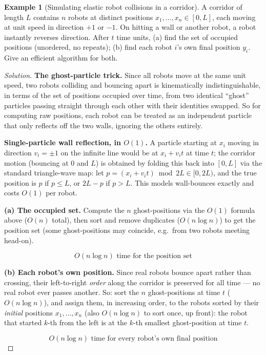 \documentclass[11pt]{article}
\theoremstyle{definition}
\newtheorem{example}{Example}[section]
\begin{document}
\begin{example}[Simulating elastic robot collisions in a corridor]
A corridor of length $L$ contains $n$ robots at distinct positions $x_1,\dots,x_n\in[0,L]$, each moving at unit speed in direction $+1$ or $-1$. On hitting a wall or another robot, a robot instantly reverses direction. After $t$ time units, (a) find the set of occupied positions (unordered, no repeats); (b) find each robot $i$'s own final position $y_i$. Give an efficient algorithm for both.
\end{example}
\begin{proof}[Solution]
\textbf{The ghost-particle trick.} Since all robots move at the same unit speed, two robots colliding and bouncing apart is kinematically indistinguishable, in terms of the set of positions occupied over time, from two identical ``ghost'' particles passing straight through each other with their identities swapped. So for computing raw positions, each robot can be treated as an independent particle that only reflects off the two walls, ignoring the others entirely.

\textbf{Single-particle wall reflection, in $O(1)$.} A particle starting at $x_i$ moving in direction $v_i=\pm1$ on the infinite line would be at $x_i+v_it$ at time $t$; the corridor motion (bouncing at $0$ and $L$) is obtained by folding this back into $[0,L]$ via the standard triangle-wave map: let $p=(x_i+v_it)\bmod 2L\in[0,2L)$, and the true position is $p$ if $p\le L$, or $2L-p$ if $p>L$. This models wall-bounces exactly and costs $O(1)$ per robot.

\textbf{(a) The occupied set.} Compute the $n$ ghost-positions via the $O(1)$ formula above ($O(n)$ total), then sort and remove duplicates ($O(n\log n)$) to get the position set (some ghost-positions may coincide, e.g.\ from two robots meeting head-on).

\[
\boxed{O(n\log n)\text{ time for the position set}}
\]

\textbf{(b) Each robot's own position.} Since real robots bounce apart rather than crossing, their left-to-right \emph{order} along the corridor is preserved for all time — no real robot ever passes another. So: sort the $n$ ghost-positions at time $t$ ($O(n\log n)$), and assign them, in increasing order, to the robots sorted by their \emph{initial} positions $x_1,\dots,x_n$ (also $O(n\log n)$ to sort once, up front): the robot that started $k$-th from the left is at the $k$-th smallest ghost-position at time $t$.

\[
\boxed{O(n\log n)\text{ time for every robot's own final position}}
\]
\end{proof}
\end{document}
